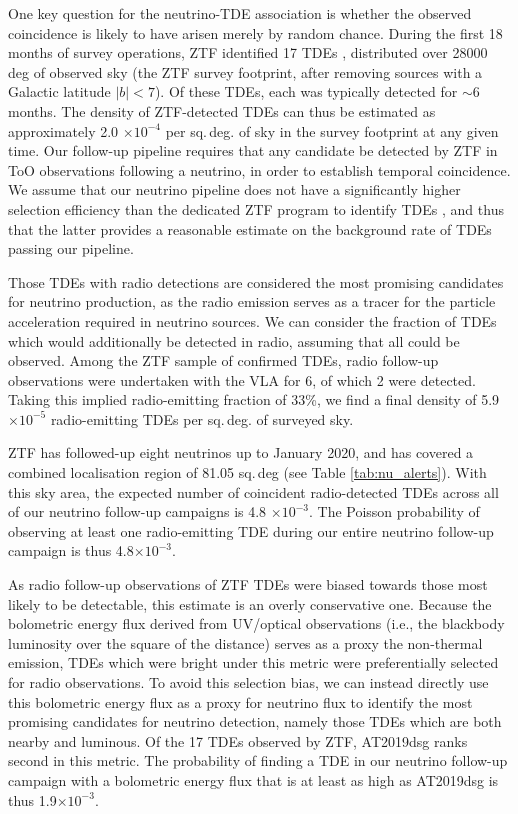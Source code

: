 One key question for the neutrino-TDE association is whether the observed coincidence is likely to have arisen merely by random chance. During the first 18 months of survey operations, ZTF identified 17 TDEs \cite{van_velzen_20}, distributed over 28000 deg of observed sky (the ZTF survey footprint, after removing sources with a Galactic latitude $|b|<7$). Of these TDEs, each was typically detected for $\sim$6 months\cite{van_velzen_20}. The density of ZTF-detected TDEs can thus be estimated as approximately 2.0 $\times 10^{-4}$ per sq.\,deg. of sky in the survey footprint at any given time. Our follow-up pipeline requires that any candidate be detected by ZTF in ToO observations following a neutrino, in order to establish temporal coincidence. We assume that our neutrino pipeline does not have a significantly higher selection efficiency than the dedicated ZTF program to identify TDEs \cite{van_velzen_20}, and thus that the latter provides a reasonable estimate on the background rate of TDEs passing our pipeline.

Those TDEs with radio detections are considered the most promising candidates for neutrino production, as the radio emission serves as a tracer for the particle acceleration required in neutrino sources. We can consider the fraction of TDEs which would additionally be detected in radio, assuming that all could be observed. Among the ZTF sample of confirmed TDEs, radio follow-up observations were undertaken with the VLA for 6, of which 2 were detected. Taking this implied radio-emitting fraction of 33\%, we find a final density of 5.9 $\times 10^{-5}$ radio-emitting TDEs per sq.\,deg. of surveyed sky. 

ZTF has followed-up eight neutrinos up to January 2020, and has covered a combined localisation region of 81.05 sq.\,deg (see Table \ref{tab:nu_alerts}). With this sky area, the expected number of coincident radio-detected TDEs across all of our neutrino follow-up campaigns is 4.8 $\times 10^{-3}$. The Poisson probability of observing at least one radio-emitting TDE during our entire neutrino follow-up campaign is thus 4.8$ \times 10^{-3}$. 

As radio follow-up observations of ZTF TDEs were biased towards those most likely to be detectable, this estimate is an overly conservative one. Because the bolometric energy flux derived from UV/optical observations (i.e., the blackbody luminosity over the square of the distance) serves as a proxy the non-thermal emission, TDEs which were bright under this metric were preferentially selected for radio observations. To avoid this selection bias, we can instead directly use this bolometric energy flux  as a proxy for neutrino flux to identify the most promising candidates for neutrino detection, namely those TDEs which are both nearby and luminous. Of the 17 TDEs observed by ZTF, AT2019dsg ranks second in this metric. The probability of finding a TDE in our neutrino follow-up campaign with a bolometric energy flux that is at least as high as AT2019dsg is thus 1.9$ \times 10^{-3}$. 

